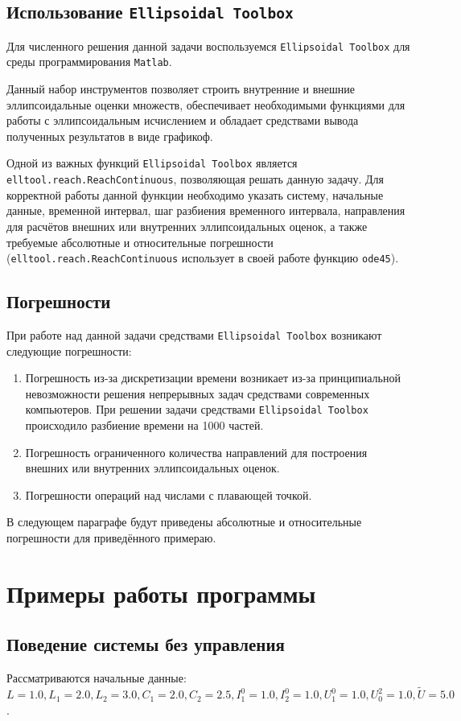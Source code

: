 \documentclass[11pt]{article}
\begin{document}
\subsection{Использование \texttt{Ellipsoidal Toolbox}}
Для численного решения данной задачи воспользуемся \texttt{Ellipsoidal Toolbox} для среды программирования \texttt{Matlab}.

Данный набор инструментов позволяет строить внутренние и внешние эллипсоидальные оценки множеств, обеспечивает необходимыми функциями для работы с эллипсоидальным исчислением и обладает средствами вывода полученных результатов в виде графикоф.

Одной из важных функций \texttt{Ellipsoidal Toolbox} является \texttt{elltool.reach.ReachContinuous}, позволяющая решать данную задачу. Для корректной работы данной функции необходимо указать систему, начальные данные, временной интервал, шаг разбиения временного интервала, направления для расчётов внешних или внутренних эллипсоидальных оценок, а также требуемые абсолютные и относительные погрешности (\texttt{elltool.reach.ReachContinuous} использует в своей работе функцию \texttt{ode45}).
\subsection{Погрешности}
При работе над данной задачи средствами \texttt{Ellipsoidal Toolbox} возникают следующие погрешности:
\begin{enumerate}
\item Погрешность из-за дискретизации времени возникает из-за принципиальной невозможности решения непрерывных задач средствами современных компьютеров. При решении задачи средствами \texttt{Ellipsoidal Toolbox} происходило разбиение времени на 1000 частей.
\item Погрешность ограниченного количества направлений для построения внешних или внутренних эллипсоидальных оценок.
\item Погрешности операций над числами с плавающей точкой.
\end{enumerate}

В следующем параграфе будут приведены абсолютные и относительные погрешности для приведённого примераю.
\section{Примеры работы программы}
\subsection{Поведение системы без управления}
Рассматриваются начальные данные: $L = 1.0, L_1 = 2.0, L_2 = 3.0, C_1 = 2.0, C_2 = 2.5, I_1^0 = 1.0, I_2^0 = 1.0, U_1^0 = 1.0, U^2_0 = 1.0, \tilde{U} = 5.0$.
\end{document}
